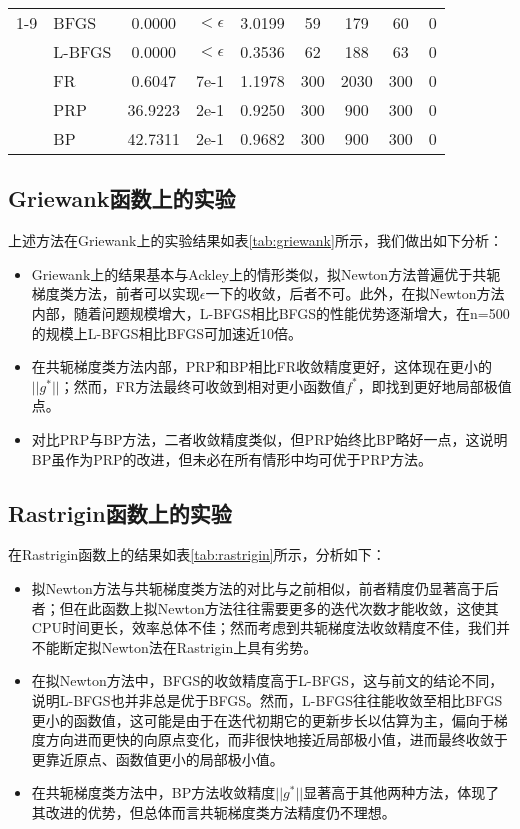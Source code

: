 \documentclass{article}
\begin{document}
\begin{table*}[t]
\begin{tabular}{c l c c c c c c c}
    \cmidrule(lr){1-9}
    \multirow{5}{*}{500} &
    BFGS & 0.0000 & $<\epsilon$ & 3.0199 & 59 & 179 & 60 & 0 \\
    & L-BFGS & 0.0000 & $<\epsilon$ & 0.3536 & 62 & 188 & 63 & 0 \\
    & FR & 0.6047 & 7e-1 & 1.1978 & 300 & 2030 & 300 & 0 \\
    & PRP & 36.9223 & 2e-1 & 0.9250 & 300 & 900 & 300 & 0 \\
    & BP & 42.7311 & 2e-1 & 0.9682 & 300 & 900 & 300 & 0 \\
    \bottomrule
  \end{tabular}
  \caption{各类方法在Griewank函数上的比较。所有算法均使用Fibonacci法进行精确线搜索。表中BP指基于Beale-Powell restart的三项方法，其余方法见前述介绍；Time指CPU时间，niter为迭代轮数，feval、geval和Geval分别指愿函数、一阶导数及hessian矩阵的计算次数。$\epsilon=1e-8$。}
  \label{tab:griewank}
\end{table*}

\subsection{Griewank函数上的实验}
上述方法在Griewank上的实验结果如表\ref{tab:griewank}所示，我们做出如下分析：
\begin{itemize}
  \item Griewank上的结果基本与Ackley上的情形类似，拟Newton方法普遍优于共轭梯度类方法，前者可以实现$\epsilon$一下的收敛，后者不可。此外，在拟Newton方法内部，随着问题规模增大，L-BFGS相比BFGS的性能优势逐渐增大，在n=500的规模上L-BFGS相比BFGS可加速近10倍。
  \item 在共轭梯度类方法内部，PRP和BP相比FR收敛精度更好，这体现在更小的$||g^*||$；然而，FR方法最终可收敛到相对更小函数值$f^*$，即找到更好地局部极值点。
  \item 对比PRP与BP方法，二者收敛精度类似，但PRP始终比BP略好一点，这说明BP虽作为PRP的改进，但未必在所有情形中均可优于PRP方法。
\end{itemize}

\subsection{Rastrigin函数上的实验}
在Rastrigin函数上的结果如表\ref{tab:rastrigin}所示，分析如下：
\begin{itemize}
  \item 拟Newton方法与共轭梯度类方法的对比与之前相似，前者精度仍显著高于后者；但在此函数上拟Newton方法往往需要更多的迭代次数才能收敛，这使其CPU时间更长，效率总体不佳；然而考虑到共轭梯度法收敛精度不佳，我们并不能断定拟Newton法在Rastrigin上具有劣势。
  \item 在拟Newton方法中，BFGS的收敛精度高于L-BFGS，这与前文的结论不同，说明L-BFGS也并非总是优于BFGS。然而，L-BFGS往往能收敛至相比BFGS更小的函数值，这可能是由于在迭代初期它的更新步长以估算为主，偏向于梯度方向进而更快的向原点变化，而非很快地接近局部极小值，进而最终收敛于更靠近原点、函数值更小的局部极小值。
  \item 在共轭梯度类方法中，BP方法收敛精度$||g^*||$显著高于其他两种方法，体现了其改进的优势，但总体而言共轭梯度类方法精度仍不理想。
\end{itemize}
\end{document}
